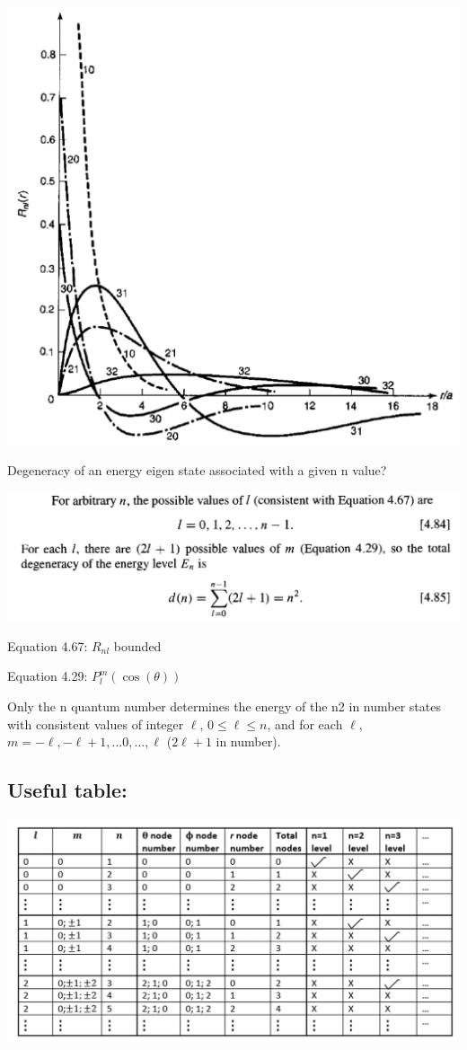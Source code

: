 \documentclass{article}
\begin{document}
    
    \includegraphics[width = 0.7 \textwidth]{Lecture21/3.png}
    
    Degeneracy of an energy eigen state associated with a given n value?

\includegraphics[width = 0.7 \textwidth]{Lecture21/4.png}

Equation 4.67: $R_{nl}$ bounded

Equation 4.29: $P_l^m(\cos(\theta))$

Only the n quantum number determines the energy of the n2 in number states with consistent values of integer $\ell$, $0 \leq \ell \leq n$, and for each $\ell$, $m=-\ell, -\ell+1,...0,...,\ell$ ($2\ell+1$ in number). 

\subsection*{Useful table:}

\includegraphics[width = 0.94 \textwidth]{Lecture21/5.png}
\end{document}
